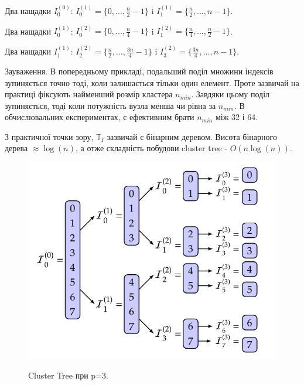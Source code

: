 \documentclass[12pt]{report}
\begin{document}
	\par Два нащадки $I_0^{(0)}$: $I_0^{(1)}=\{0,...,\frac{n}{2}-1\}$  i  $I_1^{(1)}=\{\frac{n}{2},...,n-1\}$. 
	\par Два нащадки $I_0^{(1)}$: $I_0^{(2)}=\{0,...,\frac{n}{4}-1\}$  i  $I_1^{(2)}=\{\frac{n}{4},...,\frac{n}{2}-1\}$.
	\par Два нащадки $I_1^{(1)}$: $I_2^{(2)}=\{\frac{n}{2},...,\frac{3n}{4}-1\}$  i  $I_3^{(2)}=\{\frac{3n}{4},...,n-1\}$.  
	\newline
	\par Зауваження. В попередньому прикладі, подальший поділ множини індексів зупиняється точно тоді, коли залишається тільки один елемент. Проте зазвичай на практиці фіксують найменший розмір кластера $n_{min}$. Завдяки цьому поділ зупиняється, тоді коли потужність вузла менша чи рівна за $n_{min}$. В обчислювальних експериментах, є ефективним брати $n_{min}$ між 32 і 64.
	\newline
	\par З практичної точки зору, $\mathbb{T}_{I}$ зазвичай є бінарним деревом. Висота бінарного дерева $\approx\log(n)$, а отже складність побудови cluster tree - $O(n\log(n))$.
	\begin{figure}[bh]{
	\includegraphics{1_0}
	}
	\caption{Cluster Tree при p=3.}
	\end{figure}	
\end{document}
